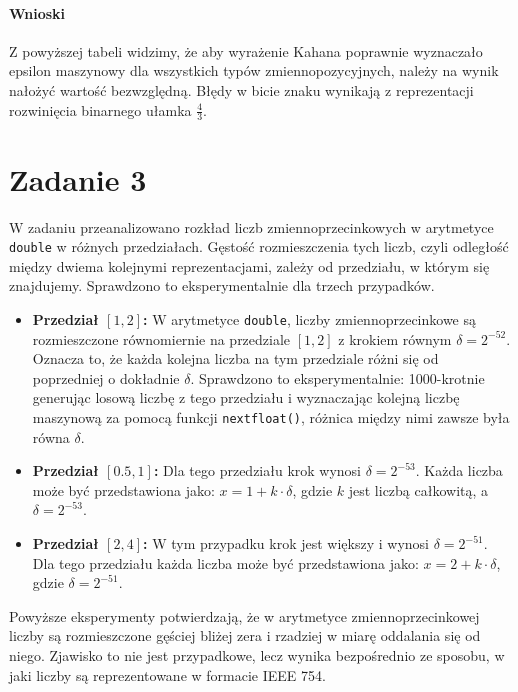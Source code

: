\documentclass{article}
\begin{document}
\paragraph{Wnioski}
\sloppy 
Z powyższej tabeli widzimy, że aby wyrażenie Kahana poprawnie wyznaczało epsilon maszynowy dla wszystkich typów zmiennopozycyjnych,
należy na wynik nałożyć wartość bezwzględną. Błędy w bicie znaku wynikają z reprezentacji rozwinięcia binarnego ułamka $\frac{4}{3}$.
\fussy %

\section*{Zadanie 3}

W zadaniu przeanalizowano rozkład liczb zmiennoprzecinkowych w arytmetyce \texttt{double} w różnych przedziałach. Gęstość rozmieszczenia tych liczb, czyli odległość między dwiema kolejnymi reprezentacjami, zależy od przedziału, w którym się znajdujemy. Sprawdzono to eksperymentalnie dla trzech przypadków.

\begin{itemize}
    \item \textbf{Przedział \([1, 2]\):} W arytmetyce \texttt{double}, liczby zmiennoprzecinkowe są rozmieszczone równomiernie na przedziale \([1, 2]\) z krokiem równym $\delta = 2^{-52}$. Oznacza to, że każda kolejna liczba na tym przedziale różni się od poprzedniej o dokładnie $\delta$. Sprawdzono to eksperymentalnie: 1000-krotnie generując losową liczbę z tego przedziału i wyznaczając kolejną liczbę maszynową za pomocą funkcji \texttt{nextfloat()}, różnica między nimi zawsze była równa $\delta$.

    \item \textbf{Przedział \([0.5, 1]\):} Dla tego przedziału krok wynosi $\delta = 2^{-53}$. Każda liczba może być przedstawiona jako: $x = 1 + k \cdot \delta$, gdzie $k$ jest liczbą całkowitą, a $\delta = 2^{-53}$.

    \item \textbf{Przedział \([2, 4]\):} W tym przypadku krok jest większy i wynosi $\delta = 2^{-51}$. Dla tego przedziału każda liczba może być przedstawiona jako: $x = 2 + k \cdot \delta$, gdzie $\delta = 2^{-51}$.
\end{itemize}

Powyższe eksperymenty potwierdzają, że w arytmetyce zmiennoprzecinkowej liczby są rozmieszczone gęściej bliżej zera i rzadziej w miarę oddalania się od niego. Zjawisko to nie jest przypadkowe, lecz wynika bezpośrednio ze sposobu, w jaki liczby są reprezentowane w formacie IEEE 754.
\end{document}
